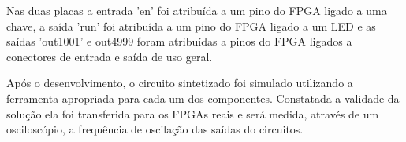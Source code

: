 Nas duas placas a entrada 'en' foi atribuída a um pino do FPGA ligado a uma chave, a saída 'run' foi atribuída a um pino do FPGA ligado a um LED e as saídas 'out1001' e out4999 foram atribuídas a pinos do FPGA ligados a conectores de entrada e saída de uso geral.

Após o desenvolvimento, o circuito sintetizado foi simulado utilizando a ferramenta apropriada para cada um dos componentes. Constatada a validade da solução ela foi transferida para os FPGAs reais e será medida, através de um osciloscópio, a frequência de oscilação das saídas do circuitos.
